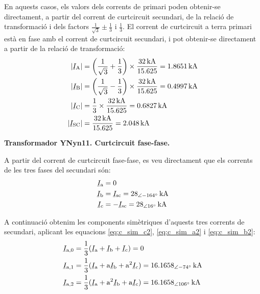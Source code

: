 \begin{exemple}[\CCasimSecTrafo{}]
    En aquests casos, els valors dels corrents de primari poden obtenir-se directament, a partir del corrent de curtcircuit secundari, de la relació de transformació i dels factors $\frac{1}{\sqrt{3}} \pm \frac{1}{3}$ i $\frac{1}{3}$. El corrent de curtcircuit a terra primari està en fase amb el corrent de curtcircuit secundari, i pot obtenir-se directament a partir de la relació de transformació:
    \begin{align*}
        |\cmplx{I}\ped{A}| &= \left(\frac{1}{\sqrt{3}}+\frac{1}{3}\right) \times \frac{\qty{32}{kA}}{\num{15,625}} = \qty{1,8651}{kA} \\
        |\cmplx{I}\ped{B}| &= \left(\frac{1}{\sqrt{3}}-\frac{1}{3}\right) \times \frac{\qty{32}{kA}}{\num{15,625}} = \qty{0,4997}{kA} \\
        |\cmplx{I}\ped{C}| &= \frac{1}{3} \times \frac{\qty{32}{kA}}{\num{15,625}} = \qty{0,6827}{kA} \\
        |\cmplx{I}\ped{SC}| &= \frac{\qty{32}{kA}}{\num{15,625}} = \qty{2,048}{kA}
    \end{align*}


    \textbf{ Transformador YNyn11. Curtcircuit fase-fase.}

    \begin{center}
       
    \end{center}

    A partir del corrent de curtcircuit fase-fase, es veu directament que els corrents de les tres fases del secundari són:
    \begin{align*}
        \cmplx{I}\ped{a} &= 0  \\
        \cmplx{I}\ped{b} &= \cmplx{I}\ped{sc} = \qtypd{28}{-164}{kA}  \\
        \cmplx{I}\ped{c} &= -\cmplx{I}\ped{sc} = \qtypd{28}{16}{kA}
    \end{align*}

    A continuació obtenim les components simètriques d'aquests tres corrents de secundari, aplicant les equacions \eqref{eq:c_sim_c2}, \eqref{eq:c_sim_a2} i \eqref{eq:c_sim_b2}:
    \begin{align*}
        \cmplx{I}\ped{a,0} &= \frac{1}{3} (\cmplx{I}\ped{a} + \cmplx{I}\ped{b} +
        \cmplx{I}\ped{c}) = 0 \\
        \cmplx{I}\ped{a,1} &= \frac{1}{3} (\cmplx{I}\ped{a} + \au \cmplx{I}\ped{b} +
         \au^2 \cmplx{I}\ped{c}) = \qtypd{16,1658}{-74}{kA}  \\
        \cmplx{I}\ped{a,2} &= \frac{1}{3} (\cmplx{I}\ped{a} + \au^2 \cmplx{I}\ped{b} +
         \au \cmplx{I}\ped{c}) = \qtypd{16,1658}{106}{kA}
    \end{align*}


\end{exemple}
